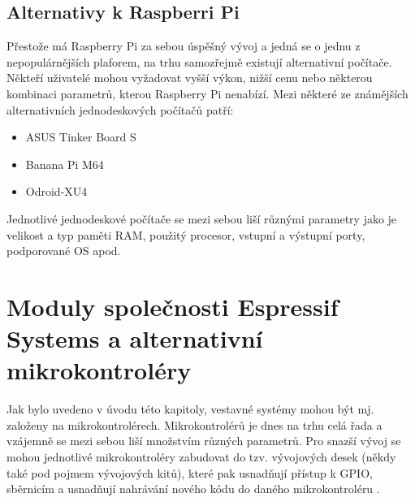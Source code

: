 \subsection*{Alternativy k Raspberri Pi}
Přestože má Raspberry Pi za sebou úspěšný vývoj a jedná se o jednu z nepopulárnějších plaforem, na trhu samozřejmě existují alternativní počítače. Někteří uživatelé mohou vyžadovat vyšší výkon, nižší cenu nebo některou kombinaci parametrů, kterou Raspberry Pi nenabízí. Mezi některé ze známějších alternativních jednodeskových počítačů patří:
\begin{itemize}
    \item ASUS Tinker Board S
    \item Banana Pi M64
    \item Odroid-XU4
\end{itemize}
Jednotlivé jednodeskové počítače se mezi sebou liší různými parametry jako je velikost a typ paměti RAM, použitý procesor, vstupní a výstupní porty, podporované OS \cite{RPiAlternatives} apod.

\section{Moduly společnosti Espressif Systems a alternativní mikrokontroléry}
Jak bylo uvedeno v úvodu této kapitoly, vestavné systémy mohou být mj. založeny na mikrokontrolérech. Mikrokontrolérů je dnes na trhu celá řada a vzájemně se mezi sebou liší množstvím různých parametrů. Pro snazší vývoj se mohou jednotlivé mikrokontroléry zabudovat do tzv. vývojových desek (někdy také pod pojmem vývojových kitů), které pak usnadňují přístup k GPIO, sběrnicím a usnadňují nahrávání nového kódu do daného mikrokontroléru \cite{DevKit}.

